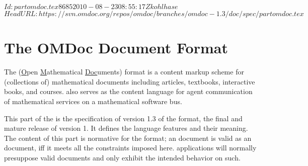 \svnInfo $Id: partomdoc.tex 8685 2010-08-23 08:55:17Z kohlhase $
\svnKeyword $HeadURL: https://svn.omdoc.org/repos/omdoc/branches/omdoc-1.3/doc/spec/partomdoc.tex $

\part{The OMDoc Document Format}\label{part:specification}
  The {\omdoc} (\underline{O}pen \underline{M}athematical \underline{Doc}uments) format is
  a content markup scheme for (collections of) mathematical documents including articles,
  textbooks, interactive books, and courses.  {\omdoc} also serves as the content language
  for agent communication of mathematical services on a mathematical software bus.

  This part of the {\report} is the specification of version 1.3 of the {\omdoc} format,
  the final and mature release of {\omdoc} version 1. It defines the {\omdoc} language
  features and their meaning. The content of this part is normative for the {\omdoc}
  format; an {\omdoc} document is valid as an {\omdoc} document, iff it meets all the
  constraints imposed here. {\omdoc} applications will normally presuppose valid {\omdoc}
  documents and only exhibit the intended behavior on such.





